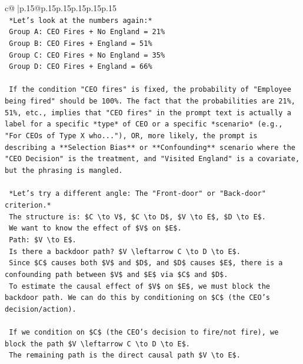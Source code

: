 \documentclass{article}
\begin{document}
{\begin{supertabular}{c@{$\;$}|p{.15\linewidth}@{}p{.15\linewidth}p{.15\linewidth}p{.15\linewidth}p{.15\linewidth}p{.15\linewidth}}
{{{\\ 
\texttt{    *Let's look at the numbers again:*} \\
\texttt{    Group A: CEO Fires + No England = 21\%} \\
\texttt{    Group B: CEO Fires + England = 51\%} \\
\texttt{    Group C: CEO Fires + No England = 35\%} \\
\texttt{    Group D: CEO Fires + England = 66\%} \\
\\ 
\texttt{    If the condition "CEO fires" is fixed, the probability of "Employee being fired" should be 100\%. The fact that the probabilities are 21\%, 51\%, etc., implies that "CEO fires" in the prompt text is actually a label for a specific *type* of CEO or a specific *scenario* (e.g., "For CEOs of Type X who..."), OR, more likely, the prompt is describing a **Selection Bias** or **Confounding** scenario where the "CEO Decision" is the treatment, and "Visited England" is a covariate, but the phrasing is mangled.} \\
\\ 
\texttt{    *Let's try a different angle: The "Front{-}door" or "Back{-}door" criterion.*} \\
\texttt{    The structure is: \$C \textbackslash{}to V\$, \$C \textbackslash{}to D\$, \$V \textbackslash{}to E\$, \$D \textbackslash{}to E\$.} \\
\texttt{    We want to know the effect of \$V\$ on \$E\$.} \\
\texttt{    Path: \$V \textbackslash{}to E\$.} \\
\texttt{    Is there a backdoor path? \$V \textbackslash{}leftarrow C \textbackslash{}to D \textbackslash{}to E\$.} \\
\texttt{    Since \$C\$ causes both \$V\$ and \$D\$, and \$D\$ causes \$E\$, there is a confounding path between \$V\$ and \$E\$ via \$C\$ and \$D\$.} \\
\texttt{    To estimate the causal effect of \$V\$ on \$E\$, we must block the backdoor path. We can do this by conditioning on \$C\$ (the CEO's decision/action).} \\
\\ 
\texttt{    If we condition on \$C\$ (the CEO's decision to fire/not fire), we block the path \$V \textbackslash{}leftarrow C \textbackslash{}to D \textbackslash{}to E\$.} \\
\texttt{    The remaining path is the direct causal path \$V \textbackslash{}to E\$.} \\
}}}
\end{supertabular}}
\end{document}
